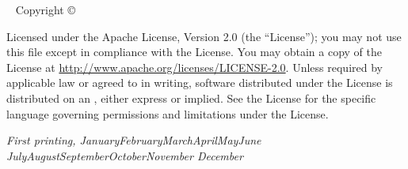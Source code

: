\documentclass{tufte-book}\usepackage[]{graphicx}\usepackage[]{xcolor}
\newcommand{\monthyear}{%
  \ifcase\month\or January\or February\or March\or April\or May\or June\or
  July\or August\or September\or October\or November\or
  December\fi\space\number\year
}
\newcommand{\openepigraph}[2]{%
  \begin{fullwidth}
  \sffamily\large
  \begin{doublespace}
  \noindent\allcaps{#1}\\%
  \noindent\allcaps{#2}%
  \end{doublespace}
  \end{fullwidth}
}
\newcommand{\blankpage}{\newpage\hbox{}\thispagestyle{empty}\newpage}
\begin{document}
\begin{comment}


The public is more familiar with bad design than good design.
It is, in effect, conditioned to prefer bad design,
because that is what it lives with.
The new becomes threatening, the old reassuring.
A designer knows that he has achieved perfection
not when there is nothing left to add,
but when there is nothing left to take away.
If I had not participated fully in all these activities,
literally hundreds of improvements would never have been made,
because I would never have thought of them or perceived
why they were important.


\end{comment}

\maketitle


\newpage
\begin{fullwidth}
~\vfill
\thispagestyle{empty}
\setlength{\parindent}{0pt}
\setlength{\parskip}{\baselineskip}
Copyright \copyright\ \the\year\ \thanklessauthor

\par{}

\par{}

\par Licensed under the Apache License, Version 2.0 (the ``License''); you may not
use this file except in compliance with the License. You may obtain a copy
of the License at \url{http://www.apache.org/licenses/LICENSE-2.0}. Unless
required by applicable law or agreed to in writing, software distributed
under the License is distributed on an , either express or implied. See the
License for the specific language governing permissions and limitations
under the License.

\par\textit{First printing, \monthyear}
\end{fullwidth}
\end{document}
